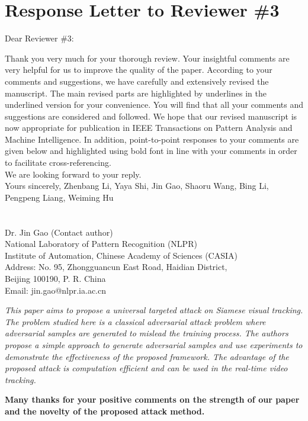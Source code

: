 \documentclass[12pt]{article}
\begin{document}
\clearpage
\newpage
{\centering\section*{Response Letter to Reviewer \#3}}
\noindent Dear Reviewer \#3:

Thank you very much for your thorough review. Your insightful comments are very helpful for us to improve the quality of the paper. According to your comments and suggestions, we have carefully and extensively revised the manuscript. The main revised parts are highlighted by underlines in the underlined version for your convenience. You will find that all your comments and suggestions are considered and followed. We hope that our revised manuscript is now appropriate for publication in IEEE Transactions on Pattern Analysis and Machine Intelligence.
In addition, point-to-point responses to your comments are given below and highlighted using bold font in line with your comments in order to facilitate cross-referencing.\\[10pt]
\indent We are looking forward to your reply.\\[10pt]
\noindent Yours sincerely,
\noindent Zhenbang Li, Yaya Shi, Jin Gao, Shaoru Wang, Bing Li, Pengpeng Liang, Weiming Hu
\\
\\
\\
\noindent Dr. Jin Gao (Contact author)\\
\noindent National Laboratory of Pattern Recognition (NLPR)\\
\noindent Institute of Automation, Chinese Academy of Sciences (CASIA)\\
\noindent Address: No. 95, Zhongguancun East Road, Haidian District,\\
\noindent Beijing 100190, P. R. China\\
\noindent Email: jin.gao@nlpr.ia.ac.cn

\newpage
\textit{This paper aims to propose a universal targeted attack on Siamese visual tracking. The problem studied here is a classical adversarial attack problem where adversarial samples are generated to mislead the training process. The authors propose a simple approach to generate adversarial samples and use experiments to demonstrate the effectiveness of the proposed framework. The advantage of the proposed attack is computation efficient and can be used in the real-time video tracking.}

\textbf{Many thanks for your positive comments on the strength of our paper and the novelty of the proposed attack method.}
\end{document}
